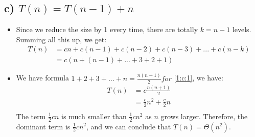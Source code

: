 \documentclass{article}
\begin{document}
	\subsection*{c) \(T(n) = T(n - 1) + n\)}
	\begin{itemize}
		\item Since we reduce the size by 1 every time, there are totally \( k = n - 1\) levels. Summing all this up, we get:
		\begin{align}
			T(n) &= cn + c(n - 1) + c(n - 2) + c(n - 3) + ... + c(n - k) \\
				 &= c(n + (n - 1) + ... + 3 + 2 + 1) \label{1:c:1}
		\end{align}
		\item We have formula \(1 + 2 + 3 + ... + n = \frac{n(n + 1)}{2} for\) \eqref{1:c:1}, we have:
		\begin{align*}
			T(n) &= c\frac{n(n + 1)}{2} \\
                 &= \frac{c}{2}n^2 + \frac{c}{2}n\\
		\end{align*}
		The term \(\frac{1}{2}cn\) is much smaller than \(\frac{1}{2}cn^2\) as \(n\) grows larger. Therefore, the dominant term is \(\frac{1}{2}cn^2\), and we can conclude that \(T(n) = \Theta(n^2)\).
	\end{itemize}
\end{document}
